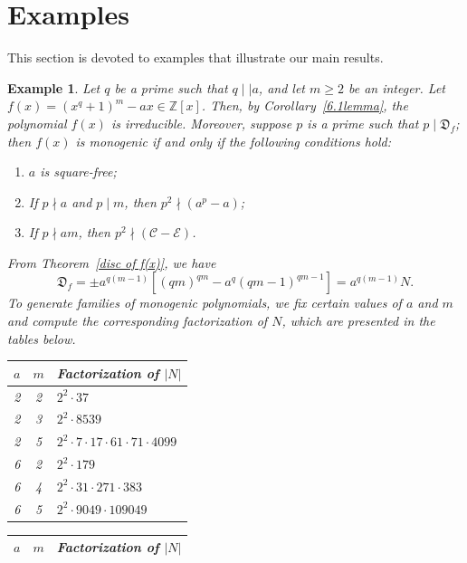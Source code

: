 \documentclass[table]{amsart}
\newtheorem{example}[theorem]{Example}
\newcommand{\D}{\mathfrak{D}}
\numberwithin{equation}{section}
\begin{document}
\section{Examples}
This section is devoted to examples that illustrate our main results.
\begin{example}
Let $q$ be a prime such that $q \mid\mid a$, and let $m \ge 2$ be an integer. Let $f(x) = (x^{q} + 1)^m - ax \in \mathbb{Z}[x]$. Then, by Corollary~\ref{6.1lemma}, the polynomial $f(x)$ is irreducible. Moreover, suppose $p$ is a prime such that $p \mid \D_f$; then $f(x)$ is monogenic if and only if the following conditions hold:
\begin{enumerate}
    \item $a$ is square-free;
    \item If $p \nmid a$ and $p \mid m$, then $p^2 \nmid (a^p - a)$;
    \item If $p \nmid am$, then $p^2 \nmid (\mathcal{C} - \mathcal{E})$.
\end{enumerate}

From Theorem~\ref{disc of f(x)}, we have \[\D_f = \pm a^{q(m-1)} \left[ (qm)^{qm} - a^q (qm-1)^{qm-1} \right] =a^{q(m-1)}N.\] To generate families of monogenic polynomials, we fix certain values of $a$ and $m$ and compute the corresponding factorization of $N$, which are presented in the tables below.

\begin{table}[h]
\centering

\begin{minipage}{0.48\textwidth}
\centering
\begin{tabular}{|c|c|l|}
\hline
$a$ & $m$ & Factorization of $|N|$ \\
\hline
2 & 2 & $2^2 \cdot 37$ \\
2 & 3 & $2^2 \cdot 8539$ \\
2 & 5 & $2^2 \cdot 7 \cdot 17 \cdot 61 \cdot 71 \cdot 4099$ \\
\hline

6 & 2 & $ 2^2 \cdot 179$ \\
6 & 4 & $ 2^2 \cdot 31 \cdot 271 \cdot 383$ \\
6 & 5 & $ 2^2 \cdot 9049 \cdot 109049$ \\
\hline
\end{tabular}
\end{minipage}
\hfill
\begin{minipage}{0.48\textwidth}
\centering
\begin{tabular}{|c|c|l|}
\hline
$a$ & $m$ & Factorization of $|N|$ \\
\hline


\end{tabular}
\end{minipage}
\end{table}
\end{example}
\end{document}
